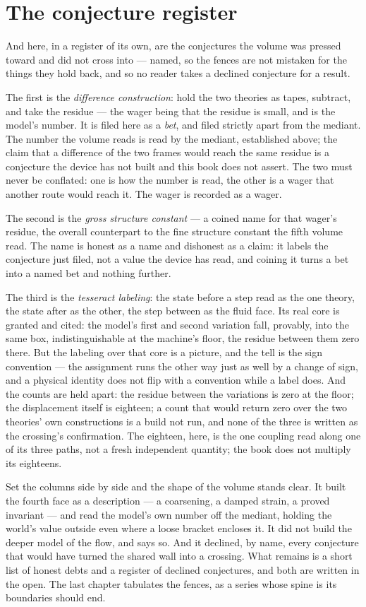 \section*{The conjecture register}

And here, in a register of its own, are the conjectures the volume was pressed
toward and did not cross into --- named, so the fences are not mistaken for the
things they hold back, and so no reader takes a declined conjecture for a result.

The first is the \emph{difference construction}: hold the two theories as tapes,
subtract, and take the residue --- the wager being that the residue is small, and
is the model's number. It is filed here as a \emph{bet}, and filed strictly apart
from the mediant. The number the volume reads is read by the mediant, established
above; the claim that a difference of the two frames would reach the same residue
is a conjecture the device has not built and this book does not assert. The two
must never be conflated: one is how the number is read, the other is a wager that
another route would reach it. The wager is recorded as a wager.

The second is the \emph{gross structure constant} --- a coined name for that
wager's residue, the overall counterpart to the fine structure constant the fifth
volume read. The name is honest as a name and dishonest as a claim: it labels the
conjecture just filed, not a value the device has read, and coining it turns a bet
into a named bet and nothing further.

The third is the \emph{tesseract labeling}: the state before a step read as the
one theory, the state after as the other, the step between as the fluid face. Its
real core is granted and cited: the model's first and second variation fall,
provably, into the same box, indistinguishable at the machine's floor, the
residue between them zero there. But the labeling over that core is a picture, and
the tell is the sign convention --- the assignment runs the other way just as
well by a change of sign, and a physical identity does not flip with a convention
while a label does. And the counts are held apart: the residue between the
variations is zero at the floor; the displacement itself is eighteen; a count that
would return zero over the two theories' own constructions is a build not run, and
none of the three is written as the crossing's confirmation. The eighteen, here,
is the one coupling read along one of its three paths, not a fresh independent
quantity; the book does not multiply its eighteens.

Set the columns side by side and the shape of the volume stands clear. It built
the fourth face as a description --- a coarsening, a damped strain, a proved
invariant --- and read the model's own number off the mediant, holding the
world's value outside even where a loose bracket encloses it. It did not build the
deeper model of the flow, and says so. And it declined, by name, every conjecture
that would have turned the shared wall into a crossing. What remains is a short
list of honest debts and a register of declined conjectures, and both are written
in the open. The last chapter tabulates the fences, as a series whose spine is its
boundaries should end.
